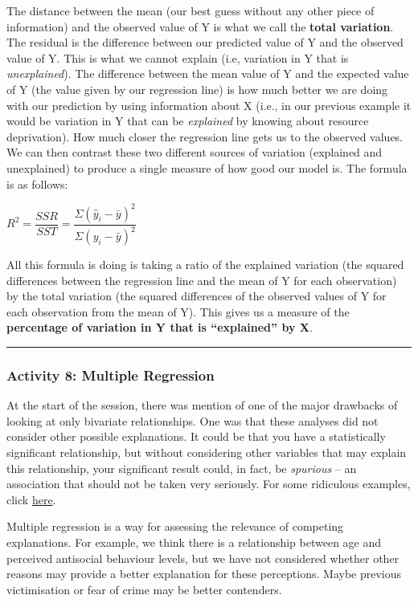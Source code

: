 \documentclass[
]{book}
\begin{document}
The distance between the mean (our best guess without any other piece of information) and the observed value of Y is what we call the \textbf{total variation}. The residual is the difference between our predicted value of Y and the observed value of Y. This is what we cannot explain (i.e, variation in Y that is \emph{unexplained}). The difference between the mean value of Y and the expected value of Y (the value given by our regression line) is how much better we are doing with our prediction by using information about X (i.e., in our previous example it would be variation in Y that can be \emph{explained} by knowing about resource deprivation). How much closer the regression line gets us to the observed values. We can then contrast these two different sources of variation (explained and unexplained) to produce a single measure of how good our model is. The formula is as follows:

\(R^2 = \dfrac{SSR}{SST} = \dfrac{\Sigma(\hat y_i - \bar y )^2}{\Sigma(y_i - \bar y )^2}\)

All this formula is doing is taking a ratio of the explained variation (the squared differences between the regression line and the mean of Y for each observation) by the total variation (the squared differences of the observed values of Y for each observation from the mean of Y). This gives us a measure of the \textbf{percentage of variation in Y that is ``explained'' by X}.

\begin{center}\rule{0.5\linewidth}{0.5pt}\end{center}

\hypertarget{activity-8-multiple-regression}{%
\subsubsection{Activity 8: Multiple Regression}\label{activity-8-multiple-regression}}

At the start of the session, there was mention of one of the major drawbacks of looking at only bivariate relationships. One was that these analyses did not consider other possible explanations. It could be that you have a statistically significant relationship, but without considering other variables that may explain this relationship, your significant result could, in fact, be \emph{spurious} -- an association that should not be taken very seriously. For some ridiculous examples, click \href{http://tylervigen.com/spurious-correlations}{here}.

Multiple regression is a way for assessing the relevance of competing explanations. For example, we think there is a relationship between age and perceived antisocial behaviour levels, but we have not considered whether other reasons may provide a better explanation for these perceptions. Maybe previous victimisation or fear of crime may be better contenders.
\end{document}
